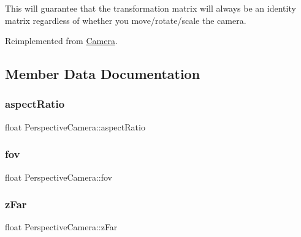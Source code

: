 This will guarantee that the transformation matrix will always be an identity matrix regardless of whether you move/rotate/scale the camera. 

Reimplemented from \hyperlink{class_camera_aea640c892a3807671d8ca49616d96eda}{Camera}.



\subsection{Member Data Documentation}
\hypertarget{class_perspective_camera_ad96660d3109e54fa282955bf66a255eb}{}\label{class_perspective_camera_ad96660d3109e54fa282955bf66a255eb} 
\subsubsection{\texorpdfstring{aspect\+Ratio}{aspectRatio}}
{\footnotesize\ttfamily float Perspective\+Camera\+::aspect\+Ratio\hspace{0.3cm}{\ttfamily [private]}}

\hypertarget{class_perspective_camera_ad693187f75ab5bfc597066364483325c}{}\label{class_perspective_camera_ad693187f75ab5bfc597066364483325c} 
\subsubsection{\texorpdfstring{fov}{fov}}
{\footnotesize\ttfamily float Perspective\+Camera\+::fov\hspace{0.3cm}{\ttfamily [private]}}

\hypertarget{class_perspective_camera_af88e6161cd3c818d49e6421f52474a2b}{}\label{class_perspective_camera_af88e6161cd3c818d49e6421f52474a2b} 
\subsubsection{\texorpdfstring{z\+Far}{zFar}}
{\footnotesize\ttfamily float Perspective\+Camera\+::z\+Far\hspace{0.3cm}{\ttfamily [private]}}

\hypertarget{class_perspective_camera_a11c1dcd1bdeb4bf8294d6272fb4d2695}{}\label{class_perspective_camera_a11c1dcd1bdeb4bf8294d6272fb4d2695} 
